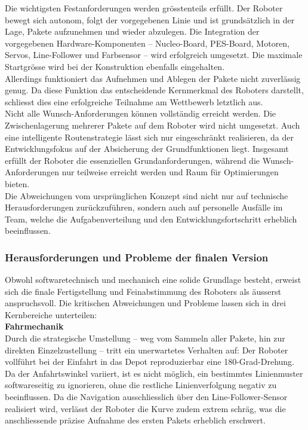 \documentclass[11pt,a4paper]{article}
\begin{document}
	Die wichtigsten Festanforderungen werden grösstenteils erfüllt. Der Roboter bewegt sich autonom, folgt der vorgegebenen Linie und ist grundsätzlich in der Lage, Pakete aufzunehmen und wieder abzulegen. Die Integration der vorgegebenen Hardware-Komponenten -- Nucleo-Board, PES-Board, Motoren, Servos, Line-Follower und Farbsensor -- wird erfolgreich umgesetzt. Die maximale Startgrösse wird bei der Konstruktion ebenfalls eingehalten.\\
	
	\noindent
	Allerdings funktioniert das Aufnehmen und Ablegen der Pakete nicht zuverlässig genug. Da diese Funktion das entscheidende Kernmerkmal des Roboters darstellt, schliesst dies eine erfolgreiche Teilnahme am Wettbewerb letztlich aus.\\
	
	\noindent
	Nicht alle Wunsch-Anforderungen können vollständig erreicht werden. Die Zwischenlagerung mehrerer Pakete auf dem Roboter wird nicht umgesetzt. Auch eine intelligente Routenstrategie lässt sich nur eingeschränkt realisieren, da der Entwicklungsfokus auf der Absicherung der Grundfunktionen liegt. Insgesamt erfüllt der Roboter die essenziellen Grundanforderungen, während die Wunsch-Anforderungen nur teilweise erreicht werden und Raum für Optimierungen bieten.\\
	
	\noindent
	Die Abweichungen vom ursprünglichen Konzept sind nicht nur auf technische Herausforderungen zurückzuführen, sondern auch auf personelle Ausfälle im Team, welche die Aufgabenverteilung und den Entwicklungsfortschritt erheblich beeinflussen.
	
	\subsubsection{Herausforderungen und Probleme der finalen Version}
	
	Obwohl softwaretechnisch und mechanisch eine solide Grundlage besteht, erweist sich die finale Fertigstellung und Feinabstimmung des Roboters als äusserst anspruchsvoll. Die kritischen Abweichungen und Probleme lassen sich in drei Kernbereiche unterteilen:\\
	
	\noindent
	\textbf{Fahrmechanik}\\
	Durch die strategische Umstellung -- weg vom Sammeln aller Pakete, hin zur direkten Einzelzustellung -- tritt ein unerwartetes Verhalten auf: Der Roboter vollführt bei der Einfahrt in das Depot reproduzierbar eine 180-Grad-Drehung. Da der Anfahrtswinkel variiert, ist es nicht möglich, ein bestimmtes Linienmuster softwareseitig zu ignorieren, ohne die restliche Linienverfolgung negativ zu beeinflussen. Da die Navigation ausschliesslich über den Line-Follower-Sensor realisiert wird, verlässt der Roboter die Kurve zudem extrem schräg, was die anschliessende präzise Aufnahme des ersten Pakets erheblich erschwert.\\
	
\end{document}
